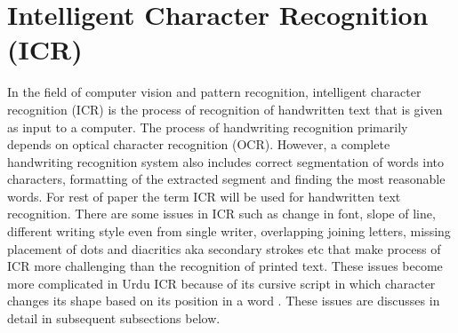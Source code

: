 \section{Intelligent Character Recognition (ICR)} \label{ICR}
In the field of computer vision and pattern recognition, intelligent character recognition (ICR) is the process of recognition of handwritten text that is given as input to a computer.  The process of handwriting recognition primarily depends on optical character recognition (OCR). However, a complete handwriting recognition system also includes correct segmentation of words into characters, formatting of the extracted segment and finding the most reasonable words. For rest of paper the term ICR will be used for handwritten text recognition. There are some issues in ICR such as  change in font, slope of line, different writing style even from single writer, overlapping joining letters, missing placement of dots and diacritics aka secondary strokes etc that make process of ICR more challenging than the recognition of printed text. These issues become more complicated in Urdu ICR because of its cursive script in which character changes its shape based on its position in a word \cite{3}. These issues are discusses in detail in subsequent subsections below. \\
